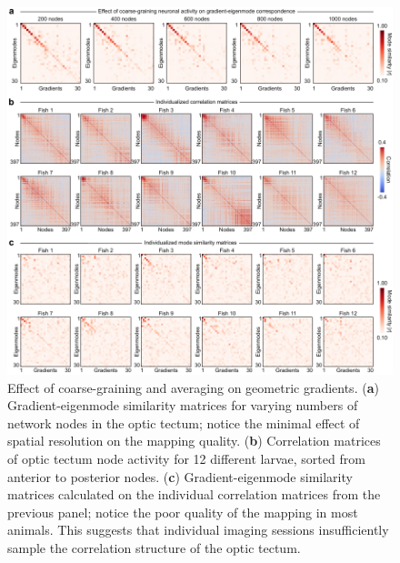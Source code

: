 \documentclass{article}
\begin{document}
\begin{figure}[t]
    \centering
    \includegraphics[width=1.0\linewidth]{figures/supp_coarsegraining.pdf}
    \caption{Effect of coarse-graining and averaging on geometric gradients. (\textbf{a}) Gradient-eigenmode similarity matrices for varying numbers of network nodes in the optic tectum; notice the minimal effect of spatial resolution on the mapping quality. (\textbf{b}) Correlation matrices of optic tectum node activity for 12 different larvae, sorted from anterior to posterior nodes. (\textbf{c}) Gradient-eigenmode similarity matrices calculated on the individual correlation matrices from the previous panel; notice the poor quality of the mapping in most animals. This suggests that individual imaging sessions insufficiently sample the correlation structure of the optic tectum.}
    \label{supp_coarsegraining}
\end{figure}

\newpage
\end{document}
